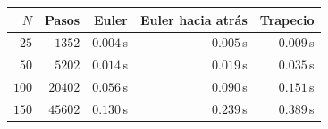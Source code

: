 \begin{tabular}{r r r r r}
\toprule
\rowcolor{Azul1!50}
$N$ & Pasos & Euler & Euler hacia atrás & Trapecio \\
\midrule
$25$ & $1352$ & $0.004$\,s & $0.005$\,s & $0.009$\,s \\
$50$ & $5202$ & $0.014$\,s & $0.019$\,s & $0.035$\,s \\
$100$ & $20402$ & $0.056$\,s & $0.090$\,s & $0.151$\,s \\
$150$ & $45602$ & $0.130$\,s & $0.239$\,s & $0.389$\,s \\
\bottomrule
\end{tabular}
